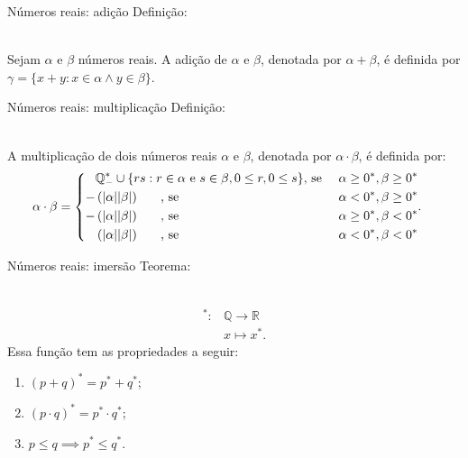 \documentclass[xcolor=dvipsnames]{beamer}
\begin{document}
\begin{frame}{Números reais: adição}
    Definição: \\~\
    
    Sejam $\alpha$ e $\beta$ números reais. A adição de $\alpha$ e $\beta$, denotada por $\alpha + \beta$, é definida por $\gamma = \{ x + y : x \in \alpha \land y \in \beta \}$.
\end{frame}

\begin{frame}{Números reais: multiplicação}
    Definição: \\~\
    
    A multiplicação de dois números reais $\alpha$ e $\beta$, denotada por $\alpha \cdot \beta$, é definida por:
    \begin{equation*}
         \alpha \cdot \beta = 
        \begin{cases}
        \begin{aligned}
            & \mathbb{Q}^*_{-} \cup \{ rs : r \in \alpha \text{ e } s \in \beta, 0 \leq r, 0 \leq s \} \text{, se } & \alpha \geq 0^*, \beta \geq 0^*  \\
            - & \left(\abs{\alpha}\abs{\beta}\right) \hspace{0.6cm} \text{, se } & \alpha < 0^*, \beta \geq 0^* \\
            - & \left(\abs{\alpha}\abs{\beta}\right) \hspace{0.6cm} \text{, se } & \alpha \geq 0^*, \beta < 0^* \\
              & \left(\abs{\alpha}\abs{\beta}\right) \hspace{0.6cm} \text{, se } & \alpha < 0^*, \beta < 0^*
        \end{aligned}.
        \end{cases}
    \end{equation*}
\end{frame}

\begin{frame}{Números reais: imersão}
    Teorema: \\~\
    
    \begin{align*}
        ^* \colon &\mathbb{Q} \to \mathbb{R} \\
        &x \mapsto x^*.
    \end{align*}
    Essa função tem as propriedades a seguir:
    \begin{enumerate}
        \item $(p + q)^* = p^* + q^*$;
        \item $(p \cdot q)^* = p^* \cdot q^*$;
        \item $p \leq q \implies p^* \leq q^*$.
    \end{enumerate}
\end{frame}
\end{document}
